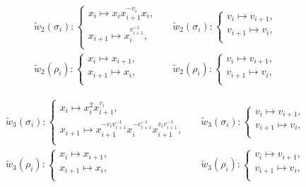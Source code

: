 \documentclass[11 pt, reqno]{amsart}
\theoremstyle{definition}
\numberwithin{equation}{subsection}
\begin{document}
\begin{align*}
&\tilde{w}_2(\sigma_i) :
\left\{
\begin{array}{l}
  x_i \mapsto  x_i x_{i+1}^{-v_i} x_i, \\
  x_{i+1} \mapsto x_i^{v_{i+1}^{-1}},  \\
\end{array}
\right.~~~
&\tilde{w}_2(\sigma_i) :
\left\{
\begin{array}{l}
  v_i \mapsto  v_{i+1}, \\
  v_{i+1} \mapsto v_i,  \\
\end{array}
\right.\\
&\tilde{w}_2(\rho_i) :
\left\{
\begin{array}{l}
  x_i \mapsto  x_{i+1}, \\
  x_{i+1} \mapsto x_i,  \\
\end{array}
\right.~~~
&\tilde{w}_2(\rho_i) :
\left\{
\begin{array}{l}
  v_i \mapsto  v_{i+1}, \\
  v_{i+1} \mapsto v_i , \\
\end{array}
\right.
\end{align*}


\begin{align*}
&\tilde{w}_3(\sigma_i) :
\left\{
\begin{array}{l}
  x_i \mapsto  x_i^2 x_{i+1}^{v_i}, \\
  x_{i+1} \mapsto x_{i+1}^{-v_iv_{i+1}^{-1}}x_i^{-v_{i+1}^{-1}}x_{i+1}^{v_iv_{i+1}^{-1}},  \\
\end{array}
\right.~~~
&\tilde{w}_3(\sigma_i) :
\left\{
\begin{array}{l}
  v_i \mapsto  v_{i+1}, \\
  v_{i+1} \mapsto v_i,  \\
\end{array}
\right.\\
&\tilde{w}_3(\rho_i) :
\left\{
\begin{array}{l}
  x_i \mapsto  x_{i+1}, \\
  x_{i+1} \mapsto x_i,  \\
\end{array}
\right.~~~
&\tilde{w}_3(\rho_i) :
\left\{
\begin{array}{l}
  v_i \mapsto  v_{i+1}, \\
  v_{i+1} \mapsto v_i , \\
\end{array}
\right.
\end{align*}
\end{document}
